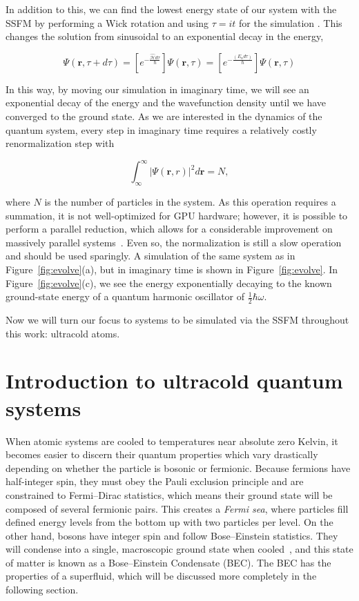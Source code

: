 In addition to this, we can find the lowest energy state of our system with the SSFM by performing a Wick rotation and using $\tau = it$ for the simulation .
This changes the solution from sinusoidal to an exponential decay in the energy,

$$
\Psi(\mathbf{r},\tau + d\tau) = \left[e^{-\frac{\mathcal{\hat{H}}d\tau}{\hbar}}\right]\Psi(\mathbf{r},\tau) = \left[e^{-\frac{(E_n d\tau)}{\hbar}}\right]\Psi(\mathbf{r},\tau)
$$

\noindent In this way, by moving our simulation in imaginary time, we will see an exponential decay of the energy and the wavefunction density until we have converged to the ground state.
As we are interested in the dynamics of the quantum system, every step in imaginary time requires a relatively costly renormalization step with

\begin{equation}
    \label{eqn:norm}
    \int_\infty^\infty |\Psi(\mathbf{r},r)|^2 d\mathbf{r} = N,
\end{equation}

\noindent where $N$ is the number of particles in the system.
As this operation requires a summation, it is not well-optimized for GPU hardware; however, it is possible to perform a parallel reduction, which allows for a considerable improvement on massively parallel systems~\cite{harris2007}.
Even so, the normalization is still a slow operation and should be used sparingly.
A simulation of the same system as in Figure~\ref{fig:evolve}(a), but in imaginary time is shown in Figure~\ref{fig:evolve}.
In Figure~\ref{fig:evolve}(c), we see the energy exponentially decaying to the known ground-state energy of a quantum harmonic oscillator of $\frac{1}{2}\hbar\omega$.

Now we will turn our focus to systems to be simulated via the SSFM throughout this work: ultracold atoms.

\section{Introduction to ultracold quantum systems}
\label{sec:intro}

When atomic systems are cooled to temperatures near absolute zero Kelvin, it becomes easier to discern their quantum properties which vary drastically depending on whether the particle is bosonic or fermionic.
Because fermions have half-integer spin, they must obey the Pauli exclusion principle and are constrained to Fermi--Dirac statistics, which means their ground state will be composed of several fermionic pairs.
This creates a \textit{Fermi sea}, where particles fill defined energy levels from the bottom up with two particles per level.
On the other hand, bosons have integer spin and follow Bose--Einstein statistics.
They will condense into a single, macroscopic ground state when cooled~\cite{Einstein1925, Fetter2003}, and
this state of matter is known as a Bose--Einstein Condensate (BEC).
The BEC has the properties of a superfluid, which will be discussed more completely in the following section.

